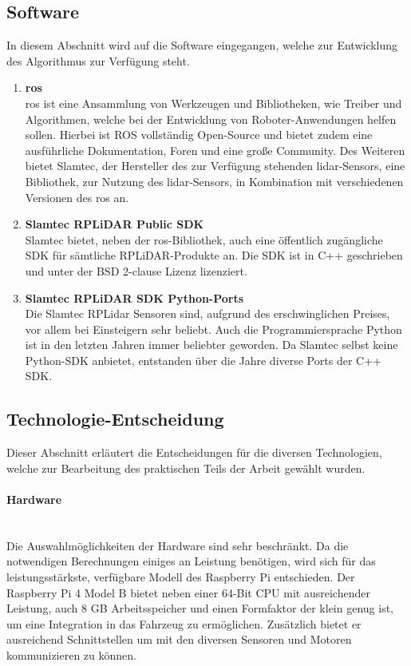 \subsection{Software}
In diesem Abschnitt wird auf die Software eingegangen, welche zur Entwicklung des Algorithmus zur Verfügung steht.

\begin{enumerate}[leftmargin=*]
    \item \textbf{\acf{ros}} \\
    \ac{ros} ist eine Ansammlung von Werkzeugen und Bibliotheken, wie Treiber und Algorithmen, welche bei der Entwicklung von Roboter-Anwendungen helfen sollen. 
    Hierbei ist ROS vollständig Open-Source und bietet zudem eine ausführliche Dokumentation, Foren und eine große Community. \cite{Ros2024}
    Des Weiteren bietet Slamtec, der Hersteller des zur Verfügung stehenden \ac{lidar}-Sensors, eine Bibliothek, zur Nutzung des \ac{lidar}-Sensors, in Kombination mit verschiedenen Versionen des \ac{ros} an. \cite{RplidarRos2023}

    \item \textbf{Slamtec RPLiDAR Public SDK} \\
    Slamtec bietet, neben der \ac{ros}-Bibliothek, auch eine öffentlich zugängliche SDK für sämtliche RPLiDAR-Produkte an. 
    Die SDK ist in C++ geschrieben und unter der BSD 2-clause Lizenz lizenziert. \cite{RplidarSDK2023}

    \item \textbf{Slamtec RPLiDAR SDK Python-Ports} \\
    Die Slamtec RPLidar Sensoren sind, aufgrund des erschwinglichen Preises, vor allem bei Einsteigern sehr beliebt.
    Auch die Programmiersprache Python ist in den letzten Jahren immer beliebter geworden.
    Da Slamtec selbst keine Python-SDK anbietet, entstanden über die Jahre diverse Ports der C++ SDK.
\end{enumerate}

\subsection{Technologie-Entscheidung}
Dieser Abschnitt erläutert die Entscheidungen für die diversen Technologien, welche zur Bearbeitung des praktischen Teils der Arbeit gewählt wurden.

\paragraph{Hardware} \mbox{}\\
Die Auswahlmöglichkeiten der Hardware sind sehr beschränkt.
Da die notwendigen Berechnungen einiges an Leistung benötigen, wird sich für das leistungsstärkste, verfügbare Modell des Raspberry Pi entschieden.
Der Raspberry Pi 4 Model B bietet neben einer 64-Bit CPU mit ausreichender Leistung, auch 8 GB Arbeitsspeicher und einen Formfaktor der klein genug ist, um eine Integration in das Fahrzeug zu ermöglichen.
Zusätzlich bietet er ausreichend Schnittstellen um mit den diversen Sensoren und Motoren kommunizieren zu können.


